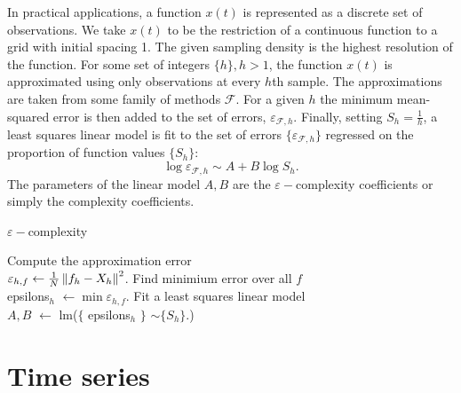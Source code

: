   In practical applications, a function $x(t)$ is represented as a discrete set of observations. We take $x(t)$ to be the restriction
  of a continuous function to a grid with initial spacing 1. The
  given sampling density is the highest resolution of the function.
  For some set of integers $\{ h \}, h > 1$, 
  the function $x(t)$ is approximated using only observations 
  at every $h$th sample. The approximations are taken from
  some family of methods $\mathcal{F}$. 
  For a given $h$ the minimum mean-squared error
   is then added to the set of errors, 
   $\varepsilon_{\mathcal{F}, h}$. 
   Finally, setting $S_h = \frac{1}{h}$, a least squares linear model is fit to the set of errors   $ \{ \varepsilon_{\mathcal{F}, h} \}$ regressed on the proportion of function values 
   $\{ S_h \} $:
  \[
      \log  \varepsilon_{\mathcal{F}, h} 
      \sim A + B \log S_h.
  \]
  The parameters of the linear model $A, B$ are the 
  $\varepsilon-$complexity coefficients or simply the  
  complexity coefficients.

   \begin{algorithm}[htb]
    \label{alg:ecomplexity}
  \caption{$\varepsilon-$complexity \label{alg:ecomplex}}
  \DontPrintSemicolon
  \SetAlgoLined
  \BlankLine 
  {    
     {
        Compute the approximation error \\ 
        $\varepsilon_{h,f} \leftarrow 
       \frac{1}{N}\left\lVert f_h - X_{h} \right\rVert^2$.  \;
    } 
     Find minimium error over all $f$  \\
     epsilons$_h$ $\leftarrow \min \varepsilon_{h,f}$. \;
  }
  Fit a least squares linear model \\
   $A,B$ $\leftarrow$ lm($\{$ epsilons$_h$ $\}$ $ \sim \{ S_h \} $.) \;
  \end{algorithm}


\section{Time series}
  
